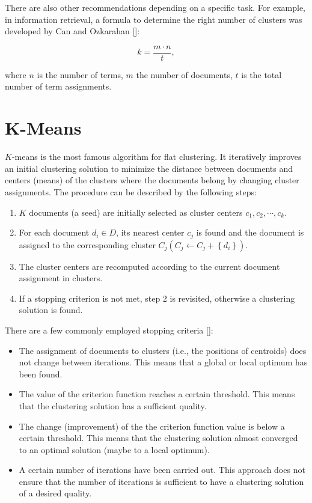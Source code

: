 There are also other recommendations depending on a specific task. For example, in information retrieval, a formula to determine the right number of clusters was developed by Can and Ozkarahan [\cite{ref42}]:


\begin{equation*}
k=\frac{m \cdot n}{t}, \tag{12.24}
\end{equation*}


where $n$ is the number of terms, $m$ the number of documents, $t$ is the total number of term assignments.

\section{K-Means}

$K$-means is the most famous algorithm for flat clustering. It iteratively improves an initial clustering solution to minimize the distance between documents and centers (means) of the clusters where the documents belong by changing cluster assignments. The procedure can be described by the following steps:

\begin{enumerate}
  \item $K$ documents (a seed) are initially selected as cluster centers $c_{1}, c_{2}, \cdots, c_{k}$.
  \item For each document $d_{i} \in D$, its nearest center $c_{j}$ is found and the document is assigned to the corresponding cluster $C_{j}\left(C_{j} \leftarrow C_{j}+\left\{d_{i}\right\}\right)$.
  \item The cluster centers are recomputed according to the current document assignment in clusters.
  \item If a stopping criterion is not met, step 2 is revisited, otherwise a clustering solution is found.
\end{enumerate}

There are a few commonly employed stopping criteria [\cite{ref185}]:

\begin{itemize}
  \item The assignment of documents to clusters (i.e., the positions of centroids) does not change between iterations. This means that a global or local optimum has been found.
  \item The value of the criterion function reaches a certain threshold. This means that the clustering solution has a sufficient quality.
  \item The change (improvement) of the the criterion function value is below a certain threshold. This means that the clustering solution almost converged to an optimal solution (maybe to a local optimum).
  \item A certain number of iterations have been carried out. This approach does not ensure that the number of iterations is sufficient to have a clustering solution of a desired quality.
\end{itemize}

